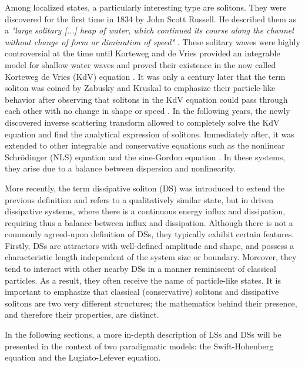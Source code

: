Among localized states, a particularly interesting type are solitons. They were discovered
 for the first time in 1834 by John Scott Russell. He described them 
 as a {\em "large solitary [...] heap of water, which continued its course along the channel without change of form
or diminution of speed"} \cite{russell1845report}. These solitary waves were highly controversial
at the time until Korteweg and de Vries provided an integrable model for shallow water waves
and proved their existence in the now called Korteweg de Vries (KdV) equation \cite{korteweg1895xli}.
It was only a century later that the term soliton was coined by Zabusky and Kruskal
to emphasize their particle-like behavior after observing that solitons in the KdV equation could pass through each
other with no change in shape or speed \cite{zabusky1965interaction}. In the following
years, the newly discovered inverse scattering transform \cite{gardner1967method, gardner1974korteweg}
allowed to completely solve the KdV equation and find the analytical expression of solitons.
Immediately after, it was extended to other integrable and conservative equations such as the nonlinear Schrödinger (NLS)
equation \cite{shabat1972exact} and the sine-Gordon equation \cite{ablowitz1973method}. 
In these systems, they arise due to a balance between dispersion and nonlinearity. 


More recently, the term dissipative soliton (DS) was introduced to extend the previous definition
and refers to a qualitatively
similar state, but in driven dissipative systems, where there is a continuous energy influx and 
dissipation, requiring thus a balance between influx and dissipation. 
Although there is not a commonly agreed-upon definition of DSs, they typically
exhibit certain features. Firstly, DSs are attractors with well-defined amplitude and shape, and
possess a characteristic length independent of the system size or boundary. Moreover, they
tend to interact with other nearby DSs in a manner reminiscent of classical particles. 
As a result, they often receive the name of particle-like states. It is important to emphasize that classical (conservative) solitons and dissipative solitons
are two very different structures; the mathematics behind their presence, and therefore their
properties, are distinct.

In the following sections, a more in-depth description of LSs and DSs will be presented 
in the context of two paradigmatic models: the Swift-Hohenberg equation and the Lugiato-Lefever
equation.  


